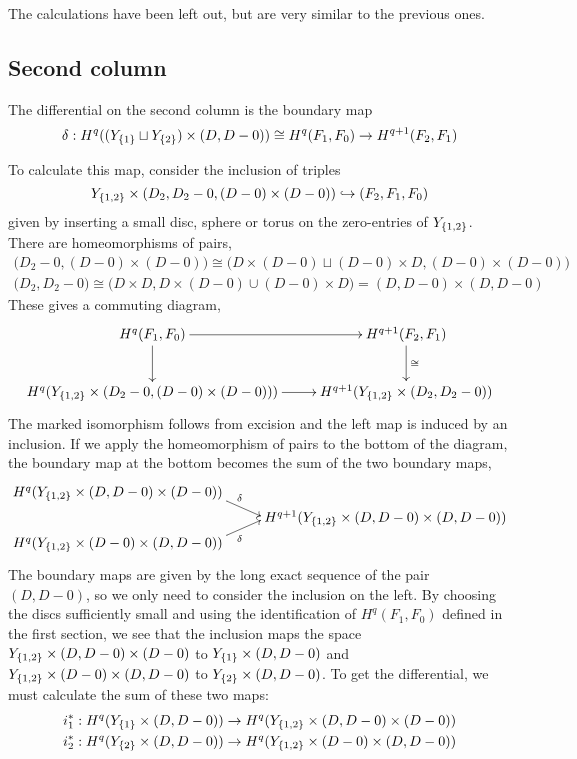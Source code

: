 The calculations have been left out, but are very similar to the
previous ones.

\subsection{Second column}

The differential on the second column is the boundary map
\[ \delta : H^q((Y_{\left\{ 1 \right\}}\sqcup Y_{\left\{ 2 \right\}})\times (D,D-0)) \cong
H^q(F_1,F_0) \to H^{q+1}(F_2,F_1) \] 

To calculate this map, consider the inclusion of triples
\[ Y_{\left\{ 1,2 \right\}}\times (D_2,D_2-0,(D-0)\times (D-0)) \hookrightarrow
(F_2,F_1,F_0) \]
given by inserting a small disc, sphere or torus on the zero-entries
of $Y_{\left\{ 1,2 \right\}}$. There are homeomorphisms of pairs,
\begin{align*}
  \big(D_2-0,(D-0)\times(D-0)\big) \cong \big(D\times (D-0) \sqcup
  (D-0)\times D, (D-0)\times(D-0)\big) \\
  \big(D_2,D_2-0\big) \cong \big(D\times D,D\times
  (D-0)\cup (D-0)\times D\big) =  (D,D-0)\times (D,D-0)
\end{align*}
These gives a commuting diagram,
\[ \xymatrix{ H^q(F_1,F_0) \ar[r] \ar[d] & H^{q+1}(F_2,F_1)
  \ar[d]^\cong \\ 
  H^q(Y_{\set{1,2}}\times (D_2-0,(D-0)\times (D-0))) \ar[r]
&
  H^{q+1}(Y_{\set{1,2}} \times (D_2,D_2-0)) %
} \]
The marked isomorphism follows from excision and the left map is
induced by an inclusion. If we apply the
homeomorphism of pairs to the bottom of the diagram, the boundary map
at the bottom becomes the sum of the two boundary maps,
\[ \xymatrix@R=0.1em{ H^q(Y_{\set{1,2}}\times (D,D-0)\times (D-0))
  \ar[]!<15ex,0ex>;[rd]!<-20ex,0ex>^{\delta} \\
  & H^{q+1}(Y_{\set{1,2}}\times (D,D-0)\times (D,D-0)) \\
  H^q(Y_{\set{1,2}}\times (D-0)\times (D,D-0))
  \ar[]!<15ex,0ex>;[ur]!<-20ex,0ex>_\delta } \]
The boundary maps are given by the long exact sequence of the pair
$(D,D-0)$, so we only need to consider the inclusion on the left. By
choosing the discs sufficiently small and using the identification of
$H^q(F_1,F_0)$ defined in the first section, 
we see that the inclusion maps the space $Y_{\left\{ 1,2 \right\}}\times
(D,D-0)\times (D-0)$ to $Y_{\left\{ 1 \right\}}\times(D,D-0)$ and
$Y_{\left\{ 1,2 \right\}}\times (D-0)\times (D,D-0)$ to $Y_{\left\{ 2 \right\}}\times
(D,D-0)$. To get the differential, we must calculate the sum of these
two maps:
\begin{align*}
  i_1^* : H^q(Y_{\left\{ 1 \right\}}\times (D,D-0)) &\to H^q(Y_{\left\{ 1,2 \right\}}\times
  (D,D-0)\times (D-0)) \\
  i_2^* : H^q(Y_{\left\{ 2 \right\}}\times (D,D-0)) &\to H^q(Y_{\left\{ 1,2 \right\}}\times
  (D-0) \times (D,D-0))
\end{align*}

